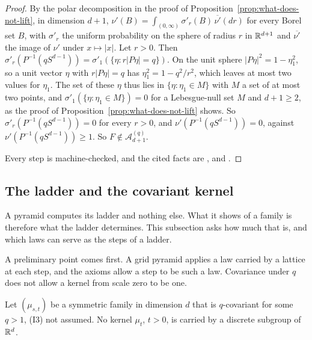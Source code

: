 \begin{proof}
By the polar decomposition in the proof of Proposition~\ref{prop:what-does-not-lift}, in dimension
$d + 1$, $\nu'(B) = \int_{(0,\infty)}\sigma'_r(B)\,\overline{\nu'}(dr)$ for every Borel set $B$, with
$\sigma'_r$ the uniform probability on the sphere of radius $r$ in $\mathbb{R}^{d+1}$ and $\overline{\nu'}$
the image of $\nu'$ under $x \mapsto |x|$. Let $r > 0$. Then
$\sigma'_r(P^{-1}(qS^{d-1})) = \sigma'_1(\{\eta : r|P\eta| = q\})$. On the unit sphere
$|P\eta|^2 = 1 - \eta_1^2$, so a unit vector $\eta$ with $r|P\eta| = q$ has
$\eta_1^2 = 1 - q^2/r^2$, which leaves at most two values for $\eta_1$. The set of these $\eta$ thus
lies in $\{\eta : \eta_1 \in M\}$ with $M$ a set of at most two points, and
$\sigma'_1(\{\eta : \eta_1 \in M\}) = 0$ for a Lebesgue-null set $M$ and $d + 1 \ge 2$, as the proof
of Proposition~\ref{prop:what-does-not-lift} shows. So $\sigma'_r(P^{-1}(qS^{d-1})) = 0$ for every
$r > 0$, and $\nu'(P^{-1}(qS^{d-1})) = 0$, against $\nu'(P^{-1}(qS^{d-1})) \ge 1$. So
$F \notin \mathcal{A}^{(q)}_{d+1}$.

Every step is machine-checked, and the cited facts are ,  and .
\end{proof}

\subsection{The ladder and the covariant kernel}
\label{sec:pyramid-ladder}

A pyramid computes its ladder and nothing else. What it shows of a family is therefore what the
ladder determines. This subsection asks how much that is, and which laws can serve as the steps of
a ladder.

A preliminary point comes first. A grid pyramid applies a law carried by a lattice at each step,
and the axioms allow a step to be such a law. Covariance under $q$ does not allow a kernel from
scale zero to be one.

\begin{proposition}
\label{prop:no-lattice-kernel}

Let $(\mu_{s,t})$ be a symmetric family in dimension $d$ that is $q$-covariant for some $q > 1$,
(I3) not assumed. No kernel $\mu_t$, $t > 0$, is carried by a discrete subgroup of $\mathbb{R}^d$.
\end{proposition}

